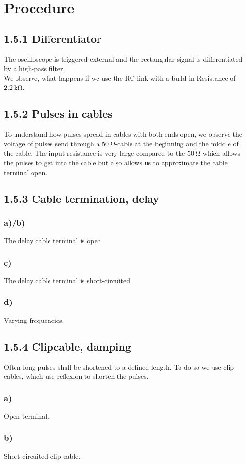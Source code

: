 \section{Procedure}
\subsection{1.5.1 Differentiator}
The oscilloscope is triggered external and the rectangular signal is differentiated by a high-pass filter.\\
We observe, what happens if we use the RC-link with a build in Resistance of $\SI{2.2}{\kilo\ohm}$.
\subsection{1.5.2 Pulses in cables}
To understand how pulses spread in cables with both ends open, we observe the voltage of pulses send through a $\SI{50}{\ohm}$-cable at the beginning and the middle of the cable. The input resistance is very large compared to the $\SI{50}{\ohm}$ which allows the pulses to get into the cable but also allows us to approximate the cable terminal open.
\subsection{1.5.3 Cable termination, delay}
\subsubsection{a)/b)}
The delay cable terminal is open
\subsubsection{c)}
The delay cable terminal is short-circuited.
\subsubsection{d)}
Varying frequencies.
\subsection{1.5.4 Clipcable, damping}
Often long pulses shall be shortened to a defined length. To do so we use clip cables, which use reflexion to shorten the pulses.
\subsubsection{a)}
Open terminal.
\subsubsection{b)}
Short-circuited clip cable.

